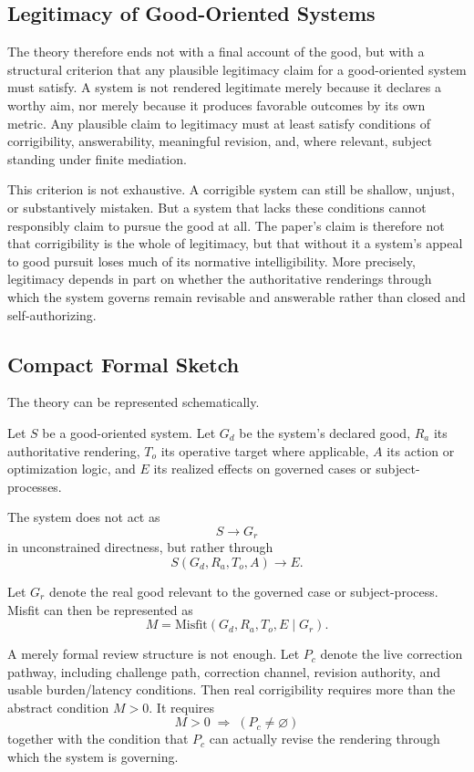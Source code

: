 \documentclass[11pt]{article}
\begin{document}
\subsection{Legitimacy of Good-Oriented Systems}

The theory therefore ends not with a final account of the good, but with a structural criterion that any plausible legitimacy claim for a good-oriented system must satisfy. A system is not rendered legitimate merely because it declares a worthy aim, nor merely because it produces favorable outcomes by its own metric. Any plausible claim to legitimacy must at least satisfy conditions of corrigibility, answerability, meaningful revision, and, where relevant, subject standing under finite mediation.

This criterion is not exhaustive. A corrigible system can still be shallow, unjust, or substantively mistaken. But a system that lacks these conditions cannot responsibly claim to pursue the good at all. The paper's claim is therefore not that corrigibility is the whole of legitimacy, but that without it a system's appeal to good pursuit loses much of its normative intelligibility. More precisely, legitimacy depends in part on whether the authoritative renderings through which the system governs remain revisable and answerable rather than closed and self-authorizing.

\subsection{Compact Formal Sketch}

The theory can be represented schematically.

Let \(S\) be a good-oriented system. Let \(G_d\) be the system's declared good, \(R_a\) its authoritative rendering, \(T_o\) its operative target where applicable, \(A\) its action or optimization logic, and \(E\) its realized effects on governed cases or subject-processes.

The system does not act as
\[
S \rightarrow G_r
\]
in unconstrained directness, but rather through
\[
S(G_d, R_a, T_o, A) \rightarrow E .
\]

Let \(G_r\) denote the real good relevant to the governed case or subject-process. Misfit can then be represented as
\[
M = \mathrm{Misfit}(G_d, R_a, T_o, E \mid G_r).
\]

A merely formal review structure is not enough. Let \(P_c\) denote the live correction pathway, including challenge path, correction channel, revision authority, and usable burden/latency conditions. Then real corrigibility requires more than the abstract condition \(M > 0\). It requires
\[
M > 0 \;\Rightarrow\; (P_c \neq \varnothing)
\]
together with the condition that \(P_c\) can actually revise the rendering through which the system is governing.
\end{document}
